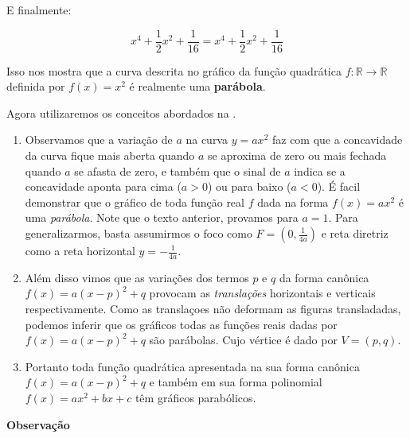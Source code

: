 E finalmente:

$$x^4+\frac{1}{2}x^2+\frac{1}{16}=x^4+\frac{1}{2}x^2+\frac{1}{16}$$

Isso nos mostra que a curva descrita no gráfico da função quadrática \(f:\mathbb{R}\to\mathbb{R}\) definida por \(f(x)=x^2\) é realmente uma \textbf{parábola}.

Agora utilizaremos os conceitos abordados na .
\begin{enumerate}
\item {} 
Observamos que a variação de \(a\) na curva \(y=ax^2\) faz com que a concavidade da curva fique mais aberta quando \(a\) se aproxima de zero ou mais fechada quando \(a\) se afasta de zero, e também que o sinal de \(a\) indica se a concavidade aponta para cima (\(a>0\)) ou para baixo (\(a<0\)). É facil demonstrar que o gráfico de toda função real \(f\) dada na forma \(f(x)=ax^2\) é uma \emph{parábola}. Note que o texto anterior, provamos para \(a=1\). Para generalizarmos, basta assumirmos o foco como \(F=(0,\frac{1}{4a})\) e reta diretriz como a reta horizontal \(y=-\frac{1}{4a}\).

\item {} 
Além disso vimos que as variações dos termos \(p\) e \(q\) da forma canônica \(f(x)=a(x-p)^2+q\) provocam as \emph{translações} horizontais e verticais respectivamente. Como as translaçoes não deformam as figuras transladadas, podemos inferir que os gráficos todas as funções reais dadas por \(f(x)=a(x-p)^2+q\) são parábolas. Cujo vértice é dado por \(V=(p,q)\).

\item {} 
Portanto toda função quadrática apresentada na sua forma canônica \(f(x)=a(x-p)^2+q\) e também em sua forma polinomial \(f(x)=ax^2+bx+c\) têm gráficos parabólicos.

\end{enumerate}

\textbf{Observação}

